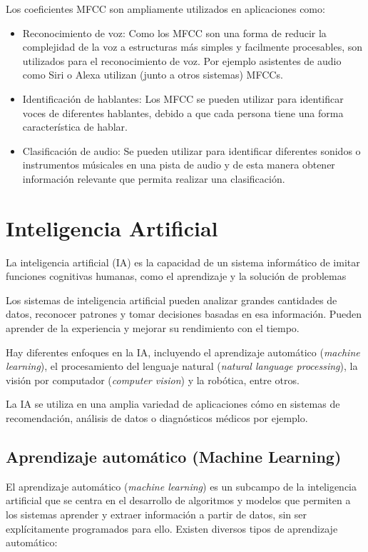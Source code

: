 Los coeficientes MFCC son ampliamente utilizados en aplicaciones como: 

\begin{itemize}
\tightlist
\item Reconocimiento de voz: Como los MFCC son una forma de reducir la complejidad de la voz a estructuras más simples y facilmente procesables, son utilizados para el reconocimiento de voz. Por ejemplo asistentes de audio como Siri o Alexa utilizan (junto a otros sistemas) MFCCs.
\item Identificación de hablantes: Los MFCC se pueden utilizar para identificar voces de diferentes hablantes, debido a que cada persona tiene una forma característica de hablar.
\item Clasificación de audio: Se pueden utilizar para identificar diferentes sonidos o instrumentos músicales en una pista de audio y de esta manera obtener información relevante que permita realizar una clasificación.
\end{itemize}



\newpage

\section{Inteligencia Artificial}

La inteligencia artificial (IA) es la capacidad de un sistema informático de imitar funciones cognitivas humanas, como el aprendizaje y la solución de problemas

Los sistemas de inteligencia artificial pueden analizar grandes cantidades de datos, reconocer patrones y tomar decisiones basadas en esa información. Pueden aprender de la experiencia y mejorar su rendimiento con el tiempo. 

Hay diferentes enfoques en la IA, incluyendo el aprendizaje automático (\textit{machine learning}), el procesamiento del lenguaje natural (\textit{natural language processing}), la visión por computador (\textit{computer vision}) y la robótica, entre otros.

La IA se utiliza en una amplia variedad de aplicaciones cómo en sistemas de recomendación, análisis de datos o diagnósticos médicos por ejemplo.

\subsection{Aprendizaje automático (Machine Learning)}
El aprendizaje automático (\textit{machine learning}) es un subcampo de la inteligencia artificial que se centra en el desarrollo de algoritmos y modelos que permiten a los sistemas aprender y extraer información a partir de datos, sin ser explícitamente programados para ello.
Existen diversos tipos de aprendizaje automático:

